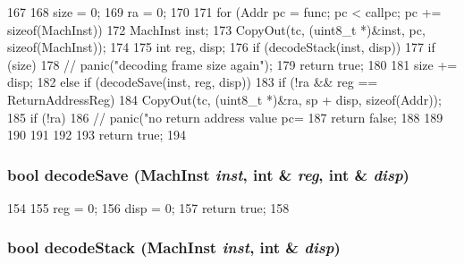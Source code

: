 \begin{DoxyCode}
167     {
168         size = 0;
169         ra = 0;
170 
171         for (Addr pc = func; pc < callpc; pc += sizeof(MachInst)) {
172             MachInst inst;
173             CopyOut(tc, (uint8_t *)&inst, pc, sizeof(MachInst));
174 
175             int reg, disp;
176             if (decodeStack(inst, disp)) {
177                 if (size) {
178                     // panic("decoding frame size again");
179                     return true;
180                 }
181                 size += disp;
182             } else if (decodeSave(inst, reg, disp)) {
183                 if (!ra && reg == ReturnAddressReg) {
184                     CopyOut(tc, (uint8_t *)&ra, sp + disp, sizeof(Addr));
185                     if (!ra) {
186                         // panic("no return address value pc=%
187                         return false;
188                     }
189                 }
190             }
191         }
192 
193         return true;
194     }
\end{DoxyCode}
\hypertarget{classX86ISA_1_1StackTrace_ae56dad5982b67d8717714c383b6a59f8}{
\subsubsection[{decodeSave}]{\setlength{\rightskip}{0pt plus 5cm}bool decodeSave ({\bf MachInst} {\em inst}, \/  int \& {\em reg}, \/  int \& {\em disp})}}
\label{classX86ISA_1_1StackTrace_ae56dad5982b67d8717714c383b6a59f8}



\begin{DoxyCode}
154     {
155         reg = 0;
156         disp = 0;
157         return true;
158     }
\end{DoxyCode}
\hypertarget{classX86ISA_1_1StackTrace_a61ba7618f77dc6e62d7b0baf6273130c}{
\subsubsection[{decodeStack}]{\setlength{\rightskip}{0pt plus 5cm}bool decodeStack ({\bf MachInst} {\em inst}, \/  int \& {\em disp})}}
\label{classX86ISA_1_1StackTrace_a61ba7618f77dc6e62d7b0baf6273130c}




